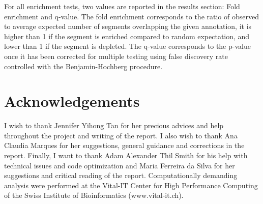 \documentclass[11pt,a4paper]{report}
\begin{document}
For all enrichment tests, two values are reported in the results section: Fold enrichment and q-value. The fold enrichment corresponds to the ratio of observed to average expected number of segments overlapping the given annotation, it is higher than 1 if the segment is enriched compared to random expectation, and lower than 1 if the segment is depleted. The q-value corresponds to the p-value once it has been corrected for multiple testing using false discovery rate controlled with the Benjamin-Hochberg procedure.

\section*{Acknowledgements}
I wish to thank Jennifer Yihong Tan for her precious advices and help throughout the project and writing of the report. I also wish to thank Ana Claudia Marques for her suggestions, general guidance and corrections in the report. Finally, I want to thank Adam Alexander Thil Smith for  his help with technical issues and code optimization and Maria Ferreira da Silva for her suggestions and critical reading of the report.
Computationally demanding analysis were performed at the Vital-IT Center for High Performance Computing of the Swiss Institute of Bioinformatics (www.vital-it.ch).


\fancyhead[L]{\slshape }

\end{document}
